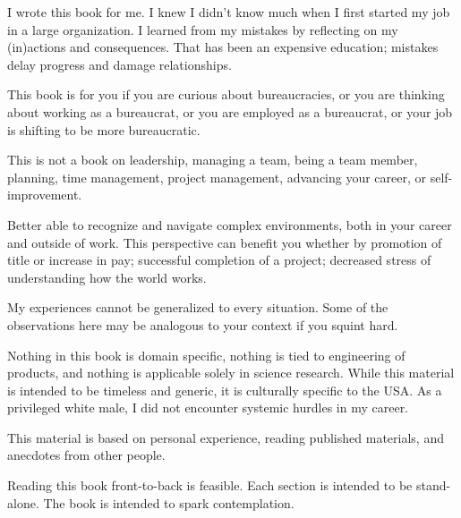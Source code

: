 I wrote this book for me. I knew I didn't know much when I first started my job in a large organization. I learned from my mistakes by reflecting on my (in)actions and consequences. That has been an expensive education; mistakes delay progress and damage relationships.

This book is for you if you are curious about bureaucracies, or you are thinking about working as a bureaucrat, or you are employed as a bureaucrat, or your job is shifting to be more bureaucratic. 


This is not a book on leadership, managing a team, being a team member, planning, time management, project management, advancing your career, or self-improvement. 

Better able to recognize and navigate complex environments, both in your career and outside of work. This perspective can benefit you whether by promotion of title or increase in pay; successful completion of a project; decreased stress of understanding how the world works.

My experiences cannot be generalized to every situation. Some of the observations here may be analogous to your context if you squint hard. 

Nothing in this book is domain specific, nothing is tied to engineering of products, and nothing is applicable solely in science research. While this material is intended to be timeless and generic, it is culturally specific to the USA. As a privileged white male, I did not encounter systemic hurdles in my career. 

This material is based on personal experience, reading published materials, and anecdotes from other people.

Reading this book front-to-back is feasible. Each section is intended to be stand-alone. The book is intended to spark contemplation. 

